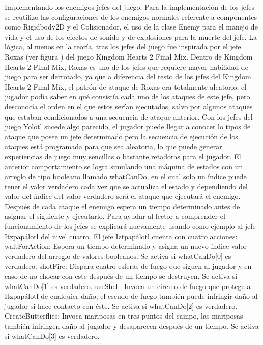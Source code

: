 Implementando los enemigos jefes del juego.
Para la implementación de los jefes se reutilizo las configuraciones de los enemigos normales referente a componentes como Rigidbody2D y el Colisionador, el uso de la clase Enemy para el manejo de vida y el uso de los efectos de sonido y de explosiones para la muerte del jefe.
La lógica, al menos en la teoría, tras los jefes del juego fue inspirada por el jefe Roxas (ver figura ) del juego Kingdom Hearts 2 Final Mix. Dentro de Kingdom Hearts 2 Final Mix, Roxas es uno de los jefes que requiere mayor habilidad de juego para ser derrotado, ya que a diferencia del resto de los jefes del Kingdom Hearts 2 Final Mix, el patrón de ataque de Roxas era totalmente aleatorio; el jugador podía saber en qué consistía cada uno de los ataques de este jefe, pero desconocía el orden en el que estos serían ejecutados, salvo por algunos ataques que estaban condicionados a una secuencia de ataque anterior.  Con los jefes del juego Yolotl sucede algo parecido, el jugador puede llegar a conocer lo tipos de ataque que posee un jefe determinado pero la secuencia de ejecución de los ataques está programada para que sea aleatoria, lo que puede generar experiencias de juego muy sencillas o bastante retadoras para el jugador. El anterior comportamiento se logra simulando una máquina de estados con un arreglo de tipo booleano llamado whatCanDo, en el cual solo un índice puede tener el valor verdadero cada vez que se actualiza el estado y dependiendo del valor del índice del valor verdadero será el ataque que ejecutará el enemigo. Después de cada ataque el enemigo espera un tiempo determinado antes de asignar el siguiente y ejecutarlo. Para ayudar al lector a comprender el funcionamiento de los jefes se explicará nuevamente usando como ejemplo al jefe Itzpapálotl del nivel cuatro. El jefe Iztpapálotl cuenta con cuatro acciones:
waitForAction: Espera un tiempo determinado y asigna un nuevo índice valor verdadero del arreglo de valores booleanos. Se activa si whatCanDo[0] es verdadero.
shotFire: Dispara cuatro esferas de fuego que siguen al jugador y en caso de no chocar con este después de un tiempo se destruyen.  Se activa si whatCanDo[1] es verdadero.
useShell: Invoca un circulo de fuego que protege a Itzpapálotl de cualquier daño, el escudo de fuego también puede infringir daño al jugador si hace contacto con éste. Se activa si whatCanDo[2] es verdadero.
CreateButterflies: Invoca mariposas en tres puntos del campo, las mariposas también infringen daño al jugador y desaparecen después de un tiempo. Se activa si whatCanDo[3] es verdadero.
